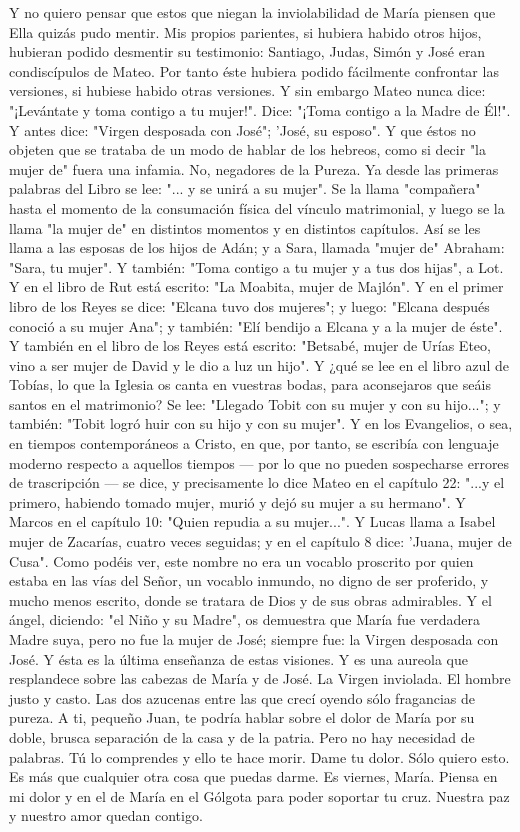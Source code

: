 \documentclass[12pt]{book} %
\begin{document}
Y no quiero pensar que estos que niegan la inviolabilidad de María piensen que Ella quizás pudo mentir. Mis propios parientes, si hubiera habido otros hijos, hubieran podido desmentir su testimonio: Santiago, Judas, Simón y José eran condiscípulos de Mateo. Por tanto éste hubiera podido fácilmente confrontar las versiones, si hubiese habido otras versiones. Y sin embargo Mateo nunca dice: "¡Levántate y toma contigo a tu mujer!". Dice: "¡Toma contigo a la Madre de Él!". Y antes dice: "Virgen desposada con José"; 'José, su esposo". 
Y que éstos no objeten que se trataba de un modo de hablar de los hebreos, como si decir "la mujer de" fuera una 
infamia. No, negadores de la Pureza. Ya desde las primeras palabras del Libro se lee: "... y se unirá a su mujer". Se la llama "compañera" hasta el momento de la consumación física del vínculo matrimonial, y luego se la llama "la mujer de" en distintos momentos y en distintos capítulos. Así se les llama a las esposas de los hijos de Adán; y a Sara, llamada "mujer de" Abraham: "Sara, tu mujer". Y también: "Toma contigo a tu mujer y a tus dos hijas", a Lot. Y en el libro de Rut está escrito: "La Moabita, mujer de Majlón". Y en el primer libro de los Reyes se dice: "Elcana tuvo dos mujeres"; y luego: "Elcana después conoció a su mujer Ana"; y también: "Elí bendijo a Elcana y a la mujer de éste". Y también en el libro de los Reyes está escrito: "Betsabé, mujer de Urías Eteo, vino a ser mujer de David y le dio a luz un hijo". Y ¿qué se lee en el libro azul de Tobías, lo que la Iglesia os canta en vuestras bodas, para aconsejaros que seáis santos en el matrimonio? Se lee: "Llegado Tobit con su mujer y con su hijo..."; y también: "Tobit logró huir con su hijo y con su mujer". 
Y en los Evangelios, o sea, en tiempos contemporáneos a Cristo, en que, por tanto, se escribía con lenguaje moderno respecto a aquellos tiempos — por lo que no pueden sospecharse errores de trascripción — se dice, y precisamente lo dice Mateo en el capítulo 22: "...y el primero, habiendo tomado mujer, murió y dejó su mujer a su hermano". Y Marcos en el capítulo 10: "Quien repudia a su mujer...". Y Lucas llama a Isabel mujer de Zacarías, cuatro veces seguidas; y en el capítulo 8 dice: 'Juana, mujer de Cusa". 
Como podéis ver, este nombre no era un vocablo proscrito por quien estaba en las vías del Señor, un vocablo inmundo, 
no digno de ser proferido, y mucho menos escrito, donde se tratara de Dios y de sus obras admirables. Y el ángel, diciendo: "el Niño y su Madre", os demuestra que María fue verdadera Madre suya, pero no fue la mujer de José; siempre fue: la Virgen desposada con José. 
Y ésta es la última enseñanza de estas visiones. Y es una aureola que resplandece sobre las cabezas de María y de José. La Virgen inviolada. El hombre justo y casto. Las dos azucenas entre las que crecí oyendo sólo fragancias de pureza. 
A ti, pequeño Juan, te podría hablar sobre el dolor de María por su doble, brusca separación de la casa y de la patria. Pero no hay necesidad de palabras. Tú lo comprendes y ello te hace morir. Dame tu dolor. Sólo quiero esto. Es más que cualquier otra cosa que puedas darme. Es viernes, María. Piensa en mi dolor y en el de María en el Gólgota para poder soportar tu cruz. 
Nuestra paz y nuestro amor quedan contigo. 
 
\end{document}
